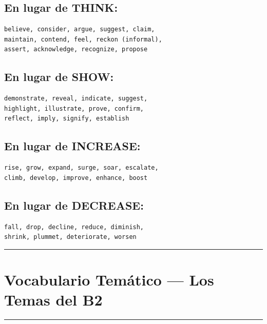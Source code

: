 \documentclass[
  spanish,
  letterpaper,
]{scrbook}
\begin{document}
\subsection{En lugar de THINK:}\label{en-lugar-de-think}

\begin{verbatim}
believe, consider, argue, suggest, claim,
maintain, contend, feel, reckon (informal),
assert, acknowledge, recognize, propose
\end{verbatim}

\subsection{En lugar de SHOW:}\label{en-lugar-de-show}

\begin{verbatim}
demonstrate, reveal, indicate, suggest,
highlight, illustrate, prove, confirm,
reflect, imply, signify, establish
\end{verbatim}

\subsection{En lugar de INCREASE:}\label{en-lugar-de-increase}

\begin{verbatim}
rise, grow, expand, surge, soar, escalate,
climb, develop, improve, enhance, boost
\end{verbatim}

\subsection{En lugar de DECREASE:}\label{en-lugar-de-decrease}

\begin{verbatim}
fall, drop, decline, reduce, diminish,
shrink, plummet, deteriorate, worsen
\end{verbatim}

\begin{center}\rule{0.5\linewidth}{0.5pt}\end{center}

\section{Vocabulario Temático --- Los Temas del
B2}\label{vocabulario-temuxe1tico-los-temas-del-b2}

\begin{center}\rule{0.5\linewidth}{0.5pt}\end{center}
\end{document}
